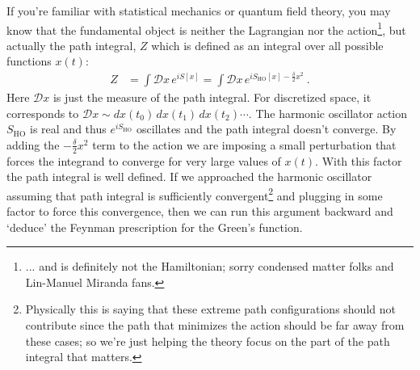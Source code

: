 If you're familiar with statistical mechanics or quantum field theory, you may know that the fundamental object is neither the Lagrangian nor the action\footnote{... and is definitely not the Hamiltonian; sorry condensed matter folks and Lin-Manuel Miranda fans.}, but actually the path integral, $Z$ which is defined as an integral over all possible functions $x(t)$:
\begin{align}
	Z &= 
	\int \mathcal Dx \, e^{iS[x]}
	= 
	\int \mathcal Dx \, e^{iS_\text{HO}[x] - \frac{\delta}{2} x^2} \ .
\end{align}
Here $\mathcal Dx$ is just the measure of the path integral. For discretized space, it corresponds to $\mathcal Dx\sim dx(t_0)\,dx(t_1)\, dx(t_2)\cdots$. The harmonic oscillator action $S_\text{HO}$ is real and thus $e^{iS_\text{HO}}$ oscillates and the path integral doesn't converge. By adding the $- \frac{\delta}{2} x^2$ term to the action we are imposing a small perturbation that forces the integrand to converge for very large values of $x(t)$. With this factor the path integral is well defined. If we approached the harmonic oscillator assuming that path integral is sufficiently convergent\footnote{Physically this is saying that these extreme path configurations should not contribute since the path that minimizes the action should be far away from these cases; so we're just helping the theory focus on the part of the path integral that matters.} and plugging in some factor to force this convergence, then we can run this argument backward and `deduce' the Feynman prescription for the Green's function.

